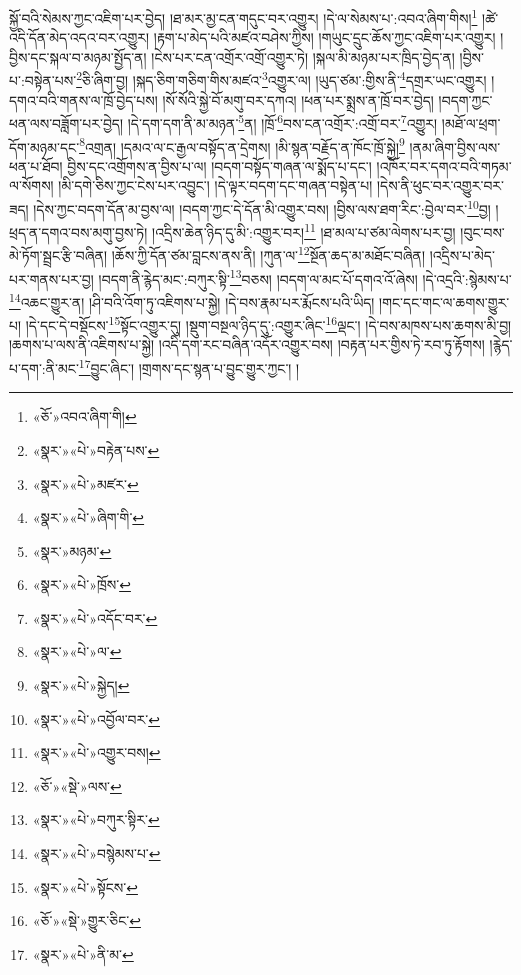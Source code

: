 སྐྱོ་བའི་སེམས་ཀྱང་འཇིག་པར་བྱེད། །ཐ་མར་མྱ་ངན་གདུང་བར་འགྱུར། །དེ་ལ་སེམས་པ་:འབའ་ཞིག་གིས།\footnote{«ཅོ་»འབའ་ཞིག་གི།} །ཚེ་འདི་དོན་མེད་འདའ་བར་འགྱུར། །རྟག་པ་མེད་པའི་མཛའ་བཤེས་ཀྱིས། །གཡུང་དྲུང་ཆོས་ཀྱང་འཇིག་པར་འགྱུར། །བྱིས་དང་སྐལ་བ་མཉམ་སྤྱོད་ན། །ངེས་པར་ངན་འགྲོར་འགྲོ་འགྱུར་ཏེ། །སྐལ་མི་མཉམ་པར་ཁྲིད་བྱེད་ན། །བྱིས་པ་:བསྟེན་པས་\footnote{«སྣར་»«པེ་»བརྟེན་པས་}ཅི་ཞིག་བྱ། །སྐད་ཅིག་གཅིག་གིས་མཛའ་\footnote{«སྣར་»«པེ་»མཛར་}འགྱུར་ལ། །ཡུད་ཙམ་:གྱིས་ནི་\footnote{«སྣར་»«པེ་»ཞིག་གི་}དགྲར་ཡང་འགྱུར། །དགའ་བའི་གནས་ལ་ཁྲོ་བྱེད་པས། །སོ་སོའི་སྐྱེ་བོ་མགུ་བར་དཀའ། །ཕན་པར་སྨྲས་ན་ཁྲོ་བར་བྱེད། །བདག་ཀྱང་ཕན་ལས་བཟློག་པར་བྱེད། །དེ་དག་དག་ནི་མ་མཉན་\footnote{«སྣར་»མཉམ་}ན། །ཁྲོ་\footnote{«སྣར་»«པེ་»ཁྲོས་}བས་ངན་འགྲོར་:འགྲོ་བར་\footnote{«སྣར་»«པེ་»འདོང་བར་}འགྱུར། །མཐོ་ལ་ཕྲག་དོག་མཉམ་དང་\footnote{«སྣར་»«པེ་»ལ་}འགྲན། །དམའ་ལ་ང་རྒྱལ་བསྟོད་ན་དྲེགས། །མི་སྙན་བརྗོད་ན་ཁོང་ཁྲོ་སྐྱེ།\footnote{«སྣར་»«པེ་»སྐྱེད།} །ནམ་ཞིག་བྱིས་ལས་ཕན་པ་ཐོབ། བྱིས་དང་འགྲོགས་ན་བྱིས་པ་ལ། །བདག་བསྟོད་གཞན་ལ་སྨོད་པ་དང་། །འཁོར་བར་དགའ་བའི་གཏམ་ལ་སོགས། །མི་དགེ་ཅིས་ཀྱང་ངེས་པར་འབྱུང་། །དེ་ལྟར་བདག་དང་གཞན་བསྟེན་པ། །དེས་ནི་ཕུང་བར་འགྱུར་བར་ཟད། །དེས་ཀྱང་བདག་དོན་མ་བྱས་ལ། །བདག་ཀྱང་དེ་དོན་མི་འགྱུར་བས། །བྱིས་ལས་ཐག་རིང་:བྱེལ་བར་\footnote{«སྣར་»«པེ་»འབྱོལ་བར་}བྱ། །ཕྲད་ན་དགའ་བས་མགུ་བྱས་ཏེ། །འདྲིས་ཆེན་ཉིད་དུ་མི་:འགྱུར་བར།\footnote{«སྣར་»«པེ་»འགྱུར་བས།} །ཐ་མལ་པ་ཙམ་ལེགས་པར་བྱ། །བུང་བས་མེ་ཏོག་སྦྲང་རྩི་བཞིན། །ཆོས་ཀྱི་དོན་ཙམ་བླངས་ནས་ནི། །ཀུན་ལ་\footnote{«ཅོ་»«སྡེ་»ལས་}སྔོན་ཆད་མ་མཐོང་བཞིན། །འདྲིས་པ་མེད་པར་གནས་པར་བྱ། །བདག་ནི་རྙེད་མང་:བཀུར་སྟི་\footnote{«སྣར་»«པེ་»བཀུར་སྟིར་}བཅས། །བདག་ལ་མང་པོ་དགའ་འོ་ཞེས། །དེ་འདྲའི་:སྙེམས་པ་\footnote{«སྣར་»«པེ་»བསྙེམས་པ་}འཆང་གྱུར་ན། །ཤི་བའི་འོག་ཏུ་འཇིགས་པ་སྐྱེ། །དེ་བས་རྣམ་པར་རྨོངས་པའི་ཡིད། །གང་དང་གང་ལ་ཆགས་གྱུར་པ། །དེ་དང་དེ་བསྡོངས་\footnote{«སྣར་»«པེ་»སྟོངས་}སྟོང་འགྱུར་དུ། །སྡུག་བསྔལ་ཉིད་དུ་:འགྱུར་ཞིང་\footnote{«ཅོ་»«སྡེ་»གྱུར་ཅིང་}ལྡང་། །དེ་བས་མཁས་པས་ཆགས་མི་བྱ། །ཆགས་པ་ལས་ནི་འཇིགས་པ་སྐྱེ། །འདི་དག་རང་བཞིན་འདོར་འགྱུར་བས། །བརྟན་པར་གྱིས་ཏེ་རབ་ཏུ་རྟོགས། །རྙེད་པ་དག་:ནི་མང་\footnote{«སྣར་»«པེ་»ནི་མ་}བྱུང་ཞིང་། །གྲགས་དང་སྙན་པ་བྱུང་གྱུར་ཀྱང་། །
